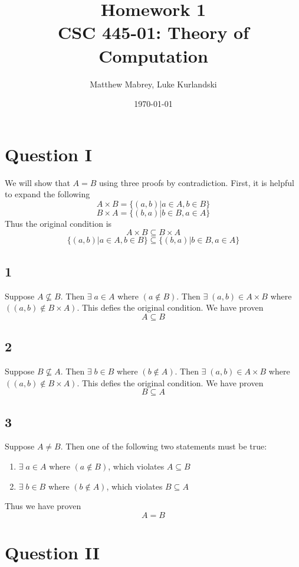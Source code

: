 \documentclass{article}
\title{Homework 1\\[0.2em]\smaller{}CSC 445-01: Theory of Computation}
\author{Matthew Mabrey, Luke Kurlandski}
\date{\today}
\begin{document}
\maketitle

\section*{Question I}

We will show that $A=B$ using three proofs by contradiction. First, it is helpful to expand the following
$$
A \times B = \biggr \{ (a,b) | a \in A, b \in B \biggr \}
$$
$$
B \times A = \biggr \{ (b,a) | b \in B, a \in A \biggr \}
$$
Thus the original condition is
$$
A \times B \subseteq B \times A
$$
$$
\biggr \{ (a,b) | a \in A, b \in B \biggr \} \subseteq \biggr \{ (b,a) | b \in B, a \in A \biggr \}
$$

\subsection*{1}
Suppose $A \not \subseteq B$. Then $\exists \; a \in A $ where $ (a \not \in B) $. Then $\exists \; (a, b) \in A \times  B $ where $ ((a, b) \not \in B \times  A ) $. This defies the original condition. We have proven
$$A \subseteq B$$

\subsection*{2}
Suppose $B \not \subseteq A$. Then $\exists \; b \in B $ where $ (b \not \in A) $. Then $\exists \; (a, b) \in A \times  B $ where $ ((a, b) \not \in B \times  A ) $. This defies the original condition. We have proven
$$B \subseteq A$$

\subsection*{3}
Suppose $A \neq B$. Then one of the following two statements must be true:
\begin{enumerate} 
\item $\exists \; a \in A $ where $ (a \not \in B) $, which violates $A \subseteq B$
\item $\exists \; b \in B $ where $ (b \not \in A) $, which violates $B \subseteq A$
\end{enumerate}
Thus we have proven
$$A = B$$

\section*{Question II}
\end{document}
